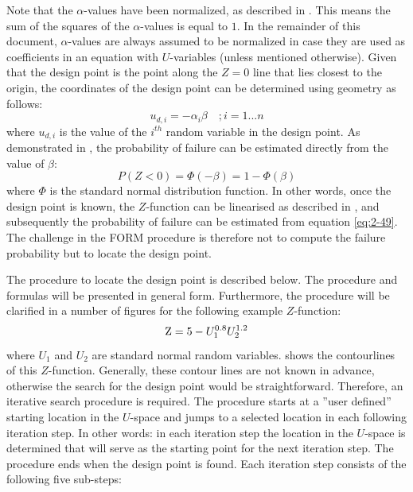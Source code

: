Note that the $\alpha$-values have been normalized, as described in . This means the sum of the squares of the $\alpha$-values is equal to $1$. In the remainder of this document, $\alpha$-values are always assumed to be normalized in case they are used as coefficients in an equation with $U$-variables (unless mentioned otherwise). Given that the design point is the point along the $Z=0$ line that lies closest to the origin, the coordinates of the design point can be determined using geometry as follows:
\begin{equation}
u_{d,i} =-\alpha _{i} \beta \quad ;i=1...n \label{eq:2-48}  
\end{equation}
where $u_{d,i}$ is the value of the $i^{th}$ random variable in the design point. As demonstrated in , the probability of failure can be estimated directly from the value of $\beta$:
\begin{equation} 
P\left(Z<0\right)=\Phi \left(-\beta \right)=1-\Phi \left(\beta \right) \label{eq:2-49}  
\end{equation}
where $\Phi$ is the standard normal distribution function. In other words, once the design point is known, the $Z$-function can be linearised as described in , and subsequently the probability of failure can be estimated from equation \eqref{eq:2-49}. The challenge in the FORM procedure is therefore not to compute the failure probability but to locate the design point. 

The procedure to locate the design point is described below. The procedure and formulas will be presented in general form. Furthermore, the procedure will be clarified in a number of figures for the following example $Z$-function: 
\begin{equation*}{\rm Z }={\rm 5} - U_{1}^{0.8}  U_{2} ^{{\rm 1}.{\rm 2}} \end{equation*}
where $U_1$ and $U_2$ are standard normal random variables.  shows the contourlines of this $Z$-function.
Generally, these contour lines are not known in advance, otherwise the search for the design point would be straightforward.
Therefore, an iterative search procedure is required.
The procedure starts at a ''user defined'' starting location in the $U$-space and jumps to a selected location in each following iteration step.
In other words: in each iteration step the location in the $U$-space is determined that will serve as the starting point for the next iteration step.
The procedure ends when the design point is found.
Each iteration step consists of the following five sub-steps:

